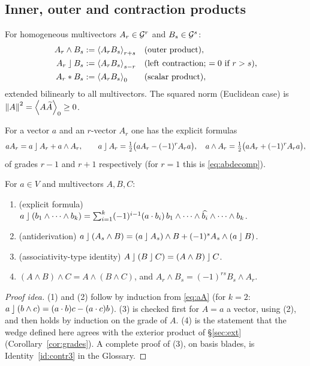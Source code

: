 \subsection{Inner, outer and contraction products}

\begin{definition}\label{def:products}
For homogeneous multivectors $A_r\in\mathcal{G}^r$ and $B_s\in\mathcal{G}^s$:
\begin{align*}
 A_r\wedge B_s&:=\left\langle A_rB_s \right\rangle_{r+s}&&\text{(outer product)},\\
 A_r\mathbin{\rfloor} B_s&:=\left\langle A_rB_s \right\rangle_{s-r}&&\text{(left contraction; $=0$ if $r>s$)},\\
 A_r*B_s&:=\left\langle A_rB_s \right\rangle_{0}&&\text{(scalar product)},
\end{align*}
extended bilinearly to all multivectors. The squared norm (Euclidean case) is $\left\lVert A\right\rVert^2=\left\langle A\widetilde{A} \right\rangle_{0}\ge0$.
\end{definition}

For a vector $a$ and an $r$-vector $A_r$ one has the explicit formulas
\begin{equation}\label{eq:aA}
 aA_r=a\mathbin{\rfloor} A_r+a\wedge A_r,\qquad
 a\mathbin{\rfloor} A_r=\tfrac12\bigl(aA_r-(-1)^rA_ra\bigr),\quad
 a\wedge A_r=\tfrac12\bigl(aA_r+(-1)^rA_ra\bigr),
\end{equation}
of grades $r-1$ and $r+1$ respectively (for $r=1$ this is \eqref{eq:abdecomp}).

\begin{proposition}[Properties]\label{prop:contr}
For $a\in V$ and multivectors $A,B,C$:
\begin{enumerate}
  \item (explicit formula) $a\mathbin{\rfloor}(b_1\wedge\cdots\wedge b_k)=\sum_{i=1}^k(-1)^{i-1}(a\cdot b_i)\,b_1\wedge\cdots\wedge\widehat{b_i}\wedge\cdots\wedge b_k$.
  \item (antiderivation) $a\mathbin{\rfloor}(A_s\wedge B)=(a\mathbin{\rfloor} A_s)\wedge B+(-1)^sA_s\wedge(a\mathbin{\rfloor} B)$.
  \item (associativity-type identity) $A\mathbin{\rfloor}(B\mathbin{\rfloor} C)=(A\wedge B)\mathbin{\rfloor} C$.
  \item $(A\wedge B)\wedge C=A\wedge(B\wedge C)$, and $A_r\wedge B_s=(-1)^{rs}B_s\wedge A_r$.
\end{enumerate}
\end{proposition}
\begin{proof}[Proof idea]
(1) and (2) follow by induction from \eqref{eq:aA} (for $k=2$: $a\mathbin{\rfloor}(b\wedge c)=(a\cdot b)c-(a\cdot c)b$). (3) is checked first for $A=a$ a vector, using (2), and then holds by induction on the grade of $A$. (4) is the statement that the wedge defined here agrees with the exterior product of \S\ref{sec:ext} (Corollary~\ref{cor:grades}).
A complete proof of (3), on basis blades, is Identity~\ref{id:contr3} in the Glossary.%
\end{proof}

